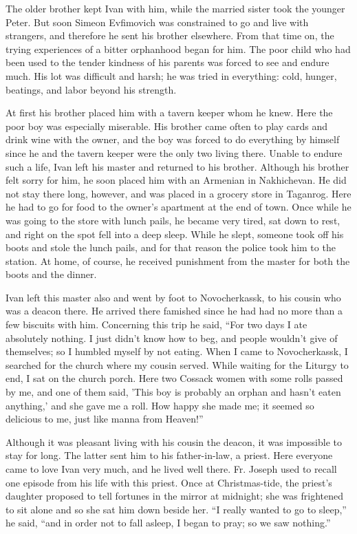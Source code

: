 The older brother kept Ivan with him, while the married sister took the younger Peter. But soon Simeon Evfimovich was constrained to go and live with strangers, and therefore he sent his brother elsewhere. From that time on, the trying experiences of a bitter orphanhood began for him. The poor child who had been used to the tender kindness of his parents was forced to see and endure much. His lot was difficult and harsh; he was tried in everything: cold, hunger, beatings, and labor beyond his strength.

At first his brother placed him with a tavern keeper whom he knew. Here the poor boy was especially miserable. His brother came often to play cards and drink wine with the owner, and the boy was forced to do everything by himself since he and the tavern keeper were the only two living there. Unable to endure such a life, Ivan left his master and returned to his brother. Although his brother felt sorry for him, he soon placed him with an Armenian in Nakhichevan. He did not stay there long, however, and was placed in a grocery store in Taganrog. Here he had to go for food to the owner's apartment at the end of town. Once while he was going to the store with lunch pails, he became very tired, sat down to rest, and right on the spot fell into a deep sleep. While he slept, someone took off his boots and stole the lunch pails, and for that reason the police took him to the station. At home, of course, he received punishment from the master for both the boots and the dinner.

Ivan left this master also and went by foot to Novocherkassk, to his cousin who was a deacon there. He arrived there famished since he had had no more than a few biscuits with him. Concerning this trip he said, “For two days I ate absolutely nothing. I just didn't know how to beg, and people wouldn't give of themselves; so I humbled myself by not eating. When I came to Novocherkassk, I searched for the church where my cousin served. While waiting for the Liturgy to end, I sat on the church porch. Here two Cossack women with some rolls passed by me, and one of them said, 'This boy is probably an orphan and hasn't eaten anything,' and she gave me a roll. How happy she made me; it seemed so delicious to me, just like manna from Heaven!”

Although it was pleasant living with his cousin the deacon, it was impossible to stay for long. The latter sent him to his father-in-law, a priest. Here everyone came to love Ivan very much, and he lived well there. Fr. Joseph used to recall one episode from his life with this priest. Once at Christmas-tide, the priest's daughter proposed to tell fortunes in the mirror at midnight; she was frightened to sit alone and so she sat him down beside her. “I really wanted to go to sleep,” he said, “and in order not to fall asleep, I began to pray; so we saw nothing.”

